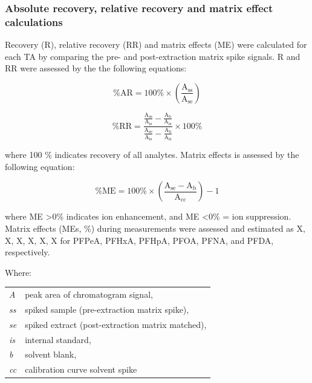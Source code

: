 \subsubsection{Absolute recovery, relative recovery and matrix effect calculations}
Recovery (R), relative recovery (RR) and matrix effects (ME) were calculated for each TA by comparing the pre- and post-extraction matrix spike signals. R and RR were assessed by the the following equations:

\begin{equation}
    \label{eq:Recovery}
    \mathrm{\% AR  = 100 \% \times \left ( \frac{A_{ss}}{A_{se}} \right ) }
\end{equation}

\begin{equation}
    \label{eq:relativeRecovery}
    \mathrm{\% RR = \frac{\frac{A_{ss}}{A_{is}}-\frac{A_{b}}{A_{is}}}{\frac{A_{se}}{A_{is}}-\frac{A_{b}}{A_{is}}}\times 100 \% }
\end{equation}

where 100 \% indicates recovery of all analytes. Matrix effects is assessed by the following equation:

\begin{equation}
    \label{eq:ME}
    \mathrm{\% ME = 100 \% \times \left(\frac{A_{se} - A_b}{A_{cc}}\right )-1 }
\end{equation}

where ME \textgreater 0\% indicates ion enhancement, and ME \textless 0\% = ion suppression. Matrix effects (MEs, \%) during measurements were assessed and estimated as X, X, X, X, X, X for PFPeA, PFHxA, PFHpA, PFOA, PFNA, and PFDA, respectively.

Where: \newline
\newline
\begin{tabular}{p{1cm}p{20cm}}
    \textit{A}   & peak area of chromatogram signal, \\
    \textit{ss}  & spiked sample (pre-extraction matrix spike), \\
    \textit{se}  & spiked extract (post-extraction matrix matched), \\
    \textit{is}  & internal standard, \\
    \textit{b}   & solvent blank, \\
    \textit{cc}  & calibration curve solvent spike \\
\end{tabular} \\

